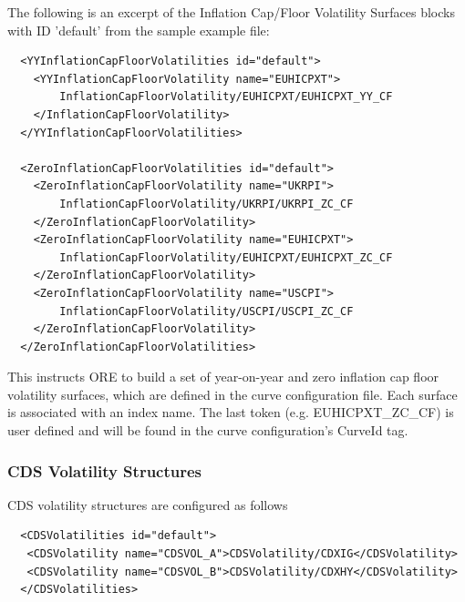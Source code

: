 The following is an excerpt of the Inflation Cap/Floor Volatility Surfaces blocks with ID 'default' from the sample example
file:

{
\begin{listing}[H]
\begin{verbatim}
  <YYInflationCapFloorVolatilities id="default">
    <YYInflationCapFloorVolatility name="EUHICPXT">
        InflationCapFloorVolatility/EUHICPXT/EUHICPXT_YY_CF
    </InflationCapFloorVolatility>
  </YYInflationCapFloorVolatilities>

  <ZeroInflationCapFloorVolatilities id="default">
    <ZeroInflationCapFloorVolatility name="UKRPI">
        InflationCapFloorVolatility/UKRPI/UKRPI_ZC_CF
    </ZeroInflationCapFloorVolatility>
    <ZeroInflationCapFloorVolatility name="EUHICPXT">
        InflationCapFloorVolatility/EUHICPXT/EUHICPXT_ZC_CF
    </ZeroInflationCapFloorVolatility>
    <ZeroInflationCapFloorVolatility name="USCPI">
        InflationCapFloorVolatility/USCPI/USCPI_ZC_CF
    </ZeroInflationCapFloorVolatility>
  </ZeroInflationCapFloorVolatilities>
\end{verbatim}
\caption{Inflation Cap/Floor Volatility Surfaces block with ID 'default'}
\label{lst:inflation_cap_floor_surface_spec}
\end{listing}

This instructs ORE to build a set of year-on-year and zero inflation cap floor volatility surfaces, which are defined in the curve
configuration file. Each surface is associated with an index name. The last token (e.g. EUHICPXT\_ZC\_CF) is user defined
and will be found in the curve configuration's CurveId tag.

\subsubsection{CDS Volatility Structures}

CDS volatility structures are configured as follows
\begin{listing}[H]
\begin{verbatim}
  <CDSVolatilities id="default">
   <CDSVolatility name="CDSVOL_A">CDSVolatility/CDXIG</CDSVolatility>
   <CDSVolatility name="CDSVOL_B">CDSVolatility/CDXHY</CDSVolatility>
  </CDSVolatilities>
\end{verbatim}
\caption{CDS volatility structure block with ID 'default'}
\label{lst:cdsvol_spec}
\end{listing}

}
